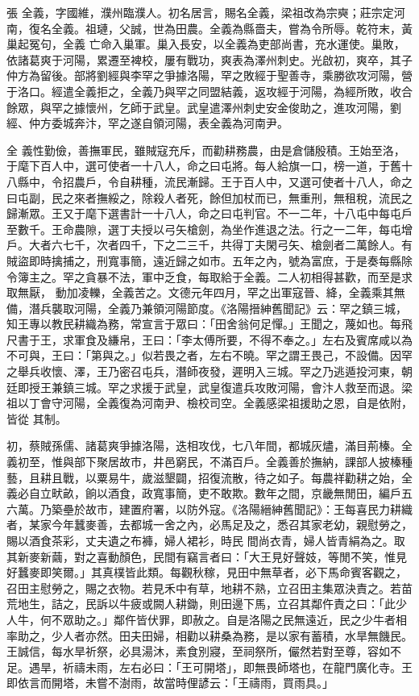 
\begin{pinyinscope}

 張
 全義，字國維，濮州臨濮人。初名居言，賜名全義，梁祖改為宗奭；莊宗定河南，復名全義。祖璉，父誠，世為田農。全義為縣嗇夫，嘗為令所辱。乾符末，黃巢起冤句，全義
 亡命入巢軍。巢入長安，以全義為吏部尚書，充水運使。巢敗，依諸葛爽于河陽，累遷至裨校，屢有戰功，爽表為澤州刺史。光啟初，爽卒，其子仲方為留後。部將劉經與李罕之爭據洛陽，罕之敗經于聖善寺，乘勝欲攻河陽，營于洛口。經遣全義拒之，全義乃與罕之同盟結義，返攻經于河陽，為經所敗，收合餘眾，與罕之據懷州，乞師于武皇。武皇遣澤州刺史安金俊助之，進攻河陽，劉經、仲方委城奔汴，罕之遂自領河陽，表全義為河南尹。



 全
 義性勤儉，善撫軍民，雖賊寇充斥，而勸耕務農，由是倉儲殷積。王始至洛，于麾下百人中，選可使者一十八人，命之曰屯將。每人給旗一口，榜一道，于舊十八縣中，令招農戶，令自耕種，流民漸歸。王于百人中，又選可使者十八人，命之曰屯副，民之來者撫綏之，除殺人者死，餘但加杖而已，無重刑，無租稅，流民之歸漸眾。王又于麾下選書計一十八人，命之曰屯判官。不一二年，十八屯中每屯戶至數千。王命農隙，選丁夫授以弓矢槍劍，為坐作進退之法。行之一二年，每屯增戶。大者六七千，次者四千，下之二三千，共得丁夫閑弓矢、槍劍者二萬餘人。有賊盜即時擒捕之，刑寬事簡，遠近歸之如市。五年之內，號為富庶，于是奏每縣除令簿主之。罕之貪暴不法，軍中乏食，每取給于全義。二人初相得甚歡，而至是求取無厭，
 動加凌轢，全義苦之。文德元年四月，罕之出軍寇晉、絳，全義乘其無備，潛兵襲取河陽，全義乃兼領河陽節度。《洛陽搢紳舊聞記》云：罕之鎮三城，知王專以教民耕織為務，常宣言于眾曰：「田舍翁何足憚。」王聞之，蔑如也。每飛尺書于王，求軍食及縑帛，王曰：「李太傅所要，不得不奉之。」左右及賓席咸以為不可與，王曰：「第與之。」似若畏之者，左右不曉。罕之謂王畏己，不設備。因罕之舉兵收懷、澤，王乃密召屯兵，潛師夜發，遲明入三城。罕之乃逃遁投河東，朝廷即授王兼鎮三城。罕之求援于武皇，武皇復遣兵攻敗河陽，會汴人救至而退。梁祖以丁會守河陽，全義復為河南尹、檢校司空。全義感梁祖援助之恩，自是依附，皆從
 其制。



 初，蔡賊孫儒、諸葛爽爭據洛陽，迭相攻伐，七八年間，都城灰燼，滿目荊榛。全義初至，惟與部下聚居故市，井邑窮民，不滿百戶。全義善於撫納，課部人披榛種藝，且耕且戰，以粟易牛，歲滋墾闢，招復流散，待之如子。每農祥勸耕之始，全義必自立畎畝，餉以酒食，政寬事簡，吏不敢欺。數年之間，京畿無閒田，編戶五六萬。乃築壘於故市，建置府署，以防外寇。《洛陽縉紳舊聞記》：王每喜民力耕織者，某家今年蠶麥善，去都城一舍之內，必馬足及之，悉召其家老幼，親慰勞之，賜以酒食茶彩，丈夫遺之布褲，婦人裙衫，時民
 間尚衣青，婦人皆青絹為之。取其新麥新繭，對之喜動顏色，民間有竊言者曰：「大王見好聲妓，等閒不笑，惟見好蠶麥即笑爾。」其真樸皆此類。每觀秋稼，見田中無草者，必下馬命賓客觀之，召田主慰勞之，賜之衣物。若見禾中有草，地耕不熟，立召田主集眾決責之。若苗荒地生，詰之，民訴以牛疲或闕人耕鋤，則田邊下馬，立召其鄰仵責之曰：「此少人牛，何不眾助之。」鄰仵皆伏罪，即赦之。自是洛陽之民無遠近，民之少牛者相率助之，少人者亦然。田夫田婦，相勸以耕桑為務，是以家有蓄積，水旱無饑民。王誠信，每水旱祈祭，必具湯沐，素食別寢，至祠祭所，儼然若對至尊，容如不足。遇旱，祈禱未雨，左右必曰：「王可開塔」，即無畏師塔也，在龍門廣化寺。王即依言而開塔，未嘗不澍雨，故當時俚諺云：「王禱雨，買雨具。」




\end{pinyinscope}
